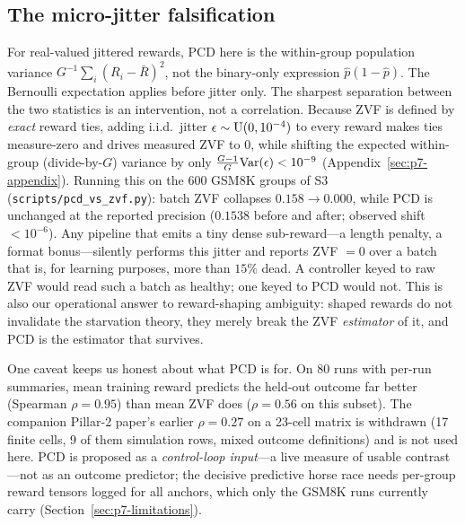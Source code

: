 \subsection{The micro-jitter falsification}
\label{sec:p7-jitter}
For real-valued jittered rewards, PCD here is the within-group population
variance $G^{-1}\sum_i(R_i-\bar R)^2$, not the binary-only expression
$\hat p(1-\hat p)$. The Bernoulli expectation applies before jitter only.
The sharpest separation between the two statistics is an intervention, not a
correlation. Because ZVF is defined by \emph{exact} reward ties, adding
i.i.d.\ jitter $\epsilon \sim \mathrm{U}(0, 10^{-4})$ to every reward makes ties
measure-zero and drives measured ZVF to $0$, while shifting the expected
within-group (divide-by-$G$) variance by only
$\frac{G-1}{G}\mathrm{Var}(\epsilon) < 10^{-9}$ (Appendix~\ref{sec:p7-appendix}).
Running this on the $600$ GSM8K groups of S3 (\texttt{scripts/pcd\_vs\_zvf.py}): batch ZVF
collapses $0.158 \to 0.000$, while PCD is unchanged at the reported
precision ($0.1538$ before and after; observed shift $< 10^{-6}$). Any
pipeline that emits a tiny dense sub-reward---a length penalty, a format
bonus---silently performs this jitter and reports ZVF $= 0$ over a batch
that is, for learning purposes, more than $15\%$ dead. A controller keyed to
raw ZVF would read such a batch as healthy; one keyed to PCD would not. This
is also our operational answer to reward-shaping ambiguity: shaped rewards
do not invalidate the starvation theory, they merely break the ZVF
\emph{estimator} of it, and PCD is the estimator that survives.

One caveat keeps us honest about what PCD is for. On $80$ runs with
per-run summaries, mean training reward predicts the held-out outcome far
better (Spearman $\rho = 0.95$) than mean ZVF does ($\rho = 0.56$ on this
subset). The companion Pillar-2 paper's earlier $\rho = 0.27$ on a 23-cell
matrix is withdrawn (17 finite cells, 9 of them simulation rows, mixed outcome
definitions) and is not used here. PCD is proposed
as a \emph{control-loop input}---a live measure of usable contrast---not as
an outcome predictor; the decisive predictive horse race needs per-group
reward tensors logged for all anchors, which only the GSM8K runs currently
carry (Section~\ref{sec:p7-limitations}).
